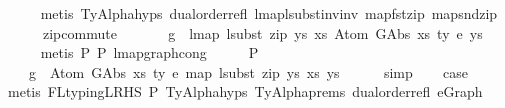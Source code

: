 \begin{isabellebody}
\ \ \ \ \isamarkupfalse%
\ {\isacharparenleft}{\kern0pt}metis\ TyAlpha{\isachardot}{\kern0pt}hyps{\isacharparenleft}{\kern0pt}{}{\isacharcomma}{\kern0pt}{}{\isacharcomma}{\kern0pt}{}{\isacharcomma}{\kern0pt}{}{\isacharparenright}{\kern0pt}\ dual{\isacharunderscore}{\kern0pt}order{\isachardot}{\kern0pt}refl\ lmap{\isacharunderscore}{\kern0pt}lsubst{\isacharunderscore}{\kern0pt}inv{\isacharunderscore}{\kern0pt}inv\ map{\isacharunderscore}{\kern0pt}fst{\isacharunderscore}{\kern0pt}zip\ map{\isacharunderscore}{\kern0pt}snd{\isacharunderscore}{\kern0pt}zip\isanewline
\ \ \ \ \ \ zip{\isacharunderscore}{\kern0pt}commute{\isacharparenright}{\kern0pt}\isanewline
\isanewline
\ \ \isamarkupfalse%
\isanewline
\ \ \ \ {\isachardoublequoteopen}g\ {\isasymsimeq}\ lmap\ {\isacharparenleft}{\kern0pt}lsubst\ {\isacharparenleft}{\kern0pt}zip\ ys{\isacharprime}{\kern0pt}\ xs{\isacharprime}{\kern0pt}{\isacharparenright}{\kern0pt}{\isacharparenright}{\kern0pt}\ {\isacharparenleft}{\kern0pt}Atom\ {\isacharparenleft}{\kern0pt}GAbs\ xs\ ty{}{\isacharprime}{\kern0pt}\ e{\isacharprime}{\kern0pt}{\isacharparenright}{\kern0pt}\ ys{\isacharparenright}{\kern0pt}{\isachardoublequoteclose}\isanewline
\ \ \ \ \isamarkupfalse%
\ {\isacharparenleft}{\kern0pt}metis\ P{}\ P{}\ lmap{\isacharunderscore}{\kern0pt}graph{\isacharunderscore}{\kern0pt}cong{\isacharparenright}{\kern0pt}\isanewline
\ \ \isamarkupfalse%
\ \isamarkupfalse%
\ P{}{\isacharcolon}{\kern0pt}\isanewline
\ \ \ \ {\isachardoublequoteopen}g\ {\isasymsimeq}\ Atom\ {\isacharparenleft}{\kern0pt}GAbs\ xs\ ty{}{\isacharprime}{\kern0pt}\ e{\isacharprime}{\kern0pt}{\isacharparenright}{\kern0pt}\ {\isacharparenleft}{\kern0pt}map\ {\isacharparenleft}{\kern0pt}lsubst\ {\isacharparenleft}{\kern0pt}zip\ ys{\isacharprime}{\kern0pt}\ xs{\isacharprime}{\kern0pt}{\isacharparenright}{\kern0pt}{\isacharparenright}{\kern0pt}\ ys{\isacharparenright}{\kern0pt}{\isachardoublequoteclose}\isanewline
\ \ \ \ \isamarkupfalse%
\ simp\isanewline
\isanewline
\ \ \isamarkupfalse%
\ {\isacharquery}{\kern0pt}case\isanewline
\ \ \ \ \isamarkupfalse%
\ {\isacharparenleft}{\kern0pt}metis\ FL{\isacharunderscore}{\kern0pt}typing{\isacharunderscore}{\kern0pt}LRHS\ P{}\ TyAlpha{\isachardot}{\kern0pt}hyps{\isacharparenleft}{\kern0pt}{}{\isacharcomma}{\kern0pt}{}{\isacharcomma}{\kern0pt}{}{\isacharcomma}{\kern0pt}{}{\isacharcomma}{\kern0pt}{}{\isacharcomma}{\kern0pt}{}{\isacharparenright}{\kern0pt}\ TyAlpha{\isachardot}{\kern0pt}prems{\isacharparenleft}{\kern0pt}{}{\isacharparenright}{\kern0pt}\ dual{\isacharunderscore}{\kern0pt}order{\isachardot}{\kern0pt}refl\ e{\isacharunderscore}{\kern0pt}Graph\isanewline

\end{isabellebody}
